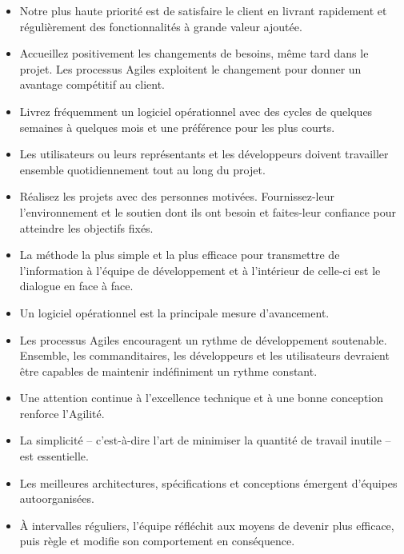 \begin{itemize}

\item Notre plus haute priorité est de satisfaire le client
en livrant rapidement et régulièrement des fonctionnalités
à grande valeur ajoutée.

\item Accueillez positivement les changements de besoins,
même tard dans le projet. Les processus Agiles
exploitent le changement pour donner un avantage
compétitif au client.

\item Livrez fréquemment un logiciel opérationnel avec des
cycles de quelques semaines à quelques mois et une
préférence pour les plus courts.

\item Les utilisateurs ou leurs représentants et les
développeurs doivent travailler ensemble quotidiennement
tout au long du projet.

\item Réalisez les projets avec des personnes motivées.
Fournissez-leur l’environnement et le soutien dont ils
ont besoin et faites-leur confiance pour atteindre les
objectifs fixés.

\item La méthode la plus simple et la plus efficace pour
transmettre de l’information à l'équipe de développement
et à l’intérieur de celle-ci est le dialogue en face à face.

\item Un logiciel opérationnel est la principale mesure d’avancement.

\item Les processus Agiles encouragent un rythme de développement
soutenable. Ensemble, les commanditaires, les développeurs
et les utilisateurs devraient être capables de maintenir
indéfiniment un rythme constant.

\item Une attention continue à l'excellence technique et
à une bonne conception renforce l’Agilité.

\item La simplicité – c’est-à-dire l’art de minimiser la
quantité de travail inutile – est essentielle.

\item Les meilleures architectures, spécifications et
conceptions émergent d'équipes autoorganisées.

\item À intervalles réguliers, l'équipe réfléchit aux moyens
de devenir plus efficace, puis règle et modifie son
comportement en conséquence.

\end{itemize}